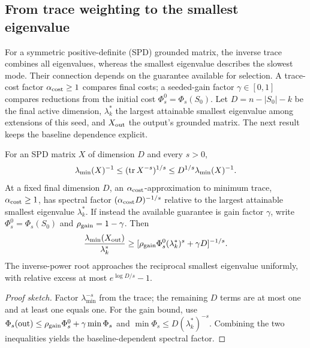 \subsection{From trace weighting to the smallest eigenvalue}
For a symmetric positive-definite (SPD) grounded matrix, the inverse
trace combines all eigenvalues, whereas the smallest eigenvalue
describes the slowest mode. Their connection
depends on the guarantee available for selection. A trace-cost factor
$\alpha_{\rm cost}\geq1$ compares final costs; a seeded-gain factor
$\gamma\in[0,1]$ compares reductions from the initial cost
$\Phi_s^0=\Phi_s(S_0)$. Let $D=n-|S_0|-k$ be the final active
dimension, $\lambda_k^*$ the largest attainable smallest eigenvalue
among extensions of this seed, and $X_{\rm out}$ the output's
grounded matrix. The next result keeps the baseline dependence explicit.

\begin{proposition}\label{main:spectral}
For an SPD matrix $X$ of dimension $D$ and every $s>0$,
\[
 \lambda_{\min}(X)^{-1}\leq(\operatorname{tr} X^{-s})^{1/s}
       \leq D^{1/s}\lambda_{\min}(X)^{-1}.
\]
At a fixed final dimension $D$, an $\alpha_{\rm cost}$-approximation to
minimum trace, $\alpha_{\rm cost}\geq1$, has spectral factor
$(\alpha_{\rm cost} D)^{-1/s}$ relative to the largest attainable smallest
eigenvalue $\lambda_k^*$.
If instead the available guarantee is gain factor $\gamma$, write
$\Phi_s^0=\Phi_s(S_0)$ and $\rho_{\rm gain}=1-\gamma$. Then
\[
 \frac{\lambda_{\min}(X_{\rm out})}{\lambda_k^*}
 \geq[\rho_{\rm gain} \Phi_s^0(\lambda_k^*)^s+\gamma D]^{-1/s}.
\]
The inverse-power root approaches the reciprocal smallest eigenvalue
uniformly, with relative excess at most $e^{\log D/s}-1$.
\end{proposition}
\begin{proof}[Proof sketch]
Factor $\lambda_{\min}^{-s}$ from the trace; the remaining
$D$ terms are at most one and at least one equals one.
For the gain bound, use
$\Phi_s({\rm out})\leq\rho_{\rm gain} \Phi_s^0+\gamma\min\Phi_s$ and
$\min\Phi_s\leq D(\lambda_k^*)^{-s}$.
Combining the two inequalities yields the baseline-dependent spectral
factor.
\end{proof}

